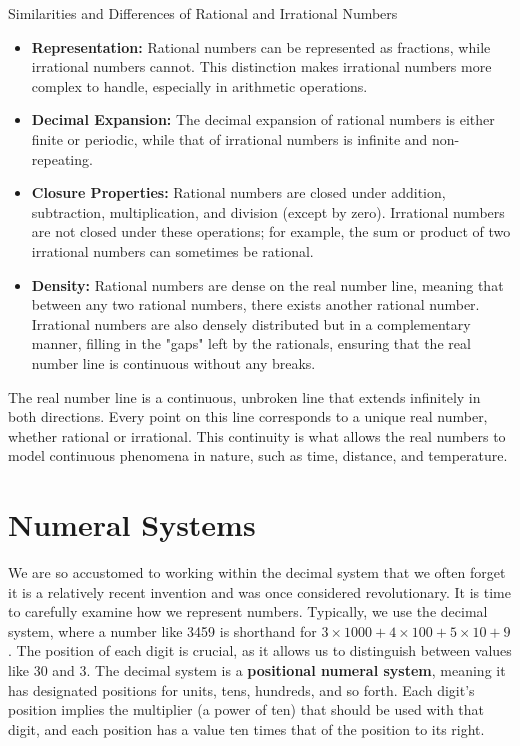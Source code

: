 \begin{custombox}{Similarities and Differences of Rational and Irrational Numbers}
    \begin{itemize}
    \item \textbf{Representation:} Rational numbers can be represented as fractions, while irrational numbers cannot. This distinction makes irrational numbers more complex to handle, especially in arithmetic operations.

    \item \textbf{Decimal Expansion:} The decimal expansion of rational numbers is either finite or periodic, while that of irrational numbers is infinite and non-repeating.

    \item \textbf{Closure Properties:} Rational numbers are closed under addition, subtraction, multiplication, and division (except by zero). Irrational numbers are not closed under these operations; for example, the sum or product of two irrational numbers can sometimes be rational.

    \item \textbf{Density:} Rational numbers are dense on the real number line, meaning that between any two rational numbers, there exists another rational number. Irrational numbers are also densely distributed but in a complementary manner, filling in the "gaps" left by the rationals, ensuring that the real number line is continuous without any breaks.
\end{itemize}
\end{custombox}

The real number line is a continuous, unbroken line that extends infinitely in both directions. Every point on this line corresponds to a unique real number, whether rational or irrational. This continuity is what allows the real numbers to model continuous phenomena in nature, such as time, distance, and temperature.

\section{Numeral Systems}

We are so accustomed to working within the decimal system that we often forget it is a relatively recent invention and was once considered revolutionary. It is time to carefully examine how we represent numbers. Typically, we use the decimal system, where a number like 3459 is shorthand for \(3 \times 1000 + 4 \times 100 + 5 \times 10 + 9\). The position of each digit is crucial, as it allows us to distinguish between values like 30 and 3. The decimal system is a\textbf{ positional numeral system}, meaning it has designated positions for units, tens, hundreds, and so forth. Each digit’s position implies the multiplier (a power of ten) that should be used with that digit, and each position has a value ten times that of the position to its right.

